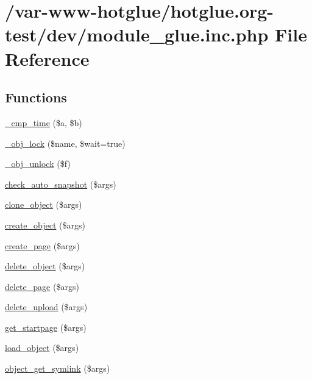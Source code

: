 \hypertarget{module__glue_8inc_8php}{
\section{/var-\/www-\/hotglue/hotglue.org-\/test/dev/module\_\-glue.inc.php File Reference}
\label{module__glue_8inc_8php}
}
\subsection*{Functions}
\begin{DoxyCompactItemize}
\item 
\hyperlink{module__glue_8inc_8php_a5fea6c120a24a298149febcbf3b1df10}{\_\-cmp\_\-time} (\$a, \$b)
\item 
\hyperlink{module__glue_8inc_8php_a21f260355b875069ca90edf1f9a559d0}{\_\-obj\_\-lock} (\$name, \$wait=true)
\item 
\hyperlink{module__glue_8inc_8php_a73a91facde5362e20df9657d31c2bb06}{\_\-obj\_\-unlock} (\$f)
\item 
\hyperlink{module__glue_8inc_8php_aaa1103a091b9dbca790e77d25a452ca5}{check\_\-auto\_\-snapshot} (\$args)
\item 
\hyperlink{module__glue_8inc_8php_a9c7f39d87787ce288ce3d8a3e389ba95}{clone\_\-object} (\$args)
\item 
\hyperlink{module__glue_8inc_8php_a12aa18f28f86274d770ba90aa88e2c3e}{create\_\-object} (\$args)
\item 
\hyperlink{module__glue_8inc_8php_a9806cd2a9b829a24876b149753e819fb}{create\_\-page} (\$args)
\item 
\hyperlink{module__glue_8inc_8php_a51fdb1d1ff829d6d2d79a9f852b7e0ef}{delete\_\-object} (\$args)
\item 
\hyperlink{module__glue_8inc_8php_af11541a6869804225793b82e54fa09fe}{delete\_\-page} (\$args)
\item 
\hyperlink{module__glue_8inc_8php_aa4865d52ac449f8aaadb3a5d425f2efb}{delete\_\-upload} (\$args)
\item 
\hyperlink{module__glue_8inc_8php_a5dd5e5f68b79a78901c25ce850b3eacf}{get\_\-startpage} (\$args)
\item 
\hyperlink{module__glue_8inc_8php_ac6b5ed5ff055ccb4d07ad17cf78d5a11}{load\_\-object} (\$args)
\item 
\hyperlink{module__glue_8inc_8php_aa9618d306b7ee5bd9e5d6a0be268ed44}{object\_\-get\_\-symlink} (\$args)
\item 

\end{DoxyCompactItemize}
